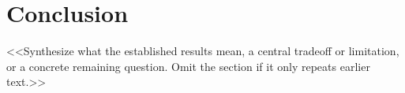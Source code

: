 \section{Conclusion}\label{sec:conclusion}
<<Synthesize what the established results mean, a central tradeoff or limitation,
or a concrete remaining question. Omit the section if it only repeats earlier text.>>
